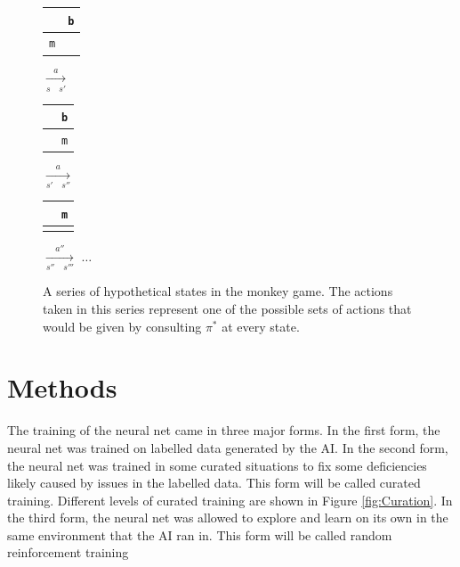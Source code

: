 \documentclass[%
 reprint,
nofootinbib,
 amsmath,amssymb,
 aps,
]{revtex4-1}
\begin{document}
\begin{figure}
  \begin{tabular}{|c|c|}
    \hline
    &\texttt{b}\\ \hline
    \texttt{m}&\\\hline
  \end{tabular}
  $\xrightarrow[s \quad s']{a}$
  \begin{tabular}{|c|c|}
    \hline
    &\texttt{b}\\ \hline
    \texttt{\hphantom{m}}&\texttt{m}\\\hline
  \end{tabular}
  $\xrightarrow[s' \quad s'']{a}$
  \begin{tabular}{|c|c|}
    \hline
    &\texttt{m}\\ \hline
    \texttt{\hphantom{m}}&\\\hline
  \end{tabular}
  $\xrightarrow[s'' \quad s''']{a''}$
  $\hdots$
  \caption{A series of hypothetical states in the monkey game. The actions taken in this series represent one of the possible sets of actions that would be given by consulting $\pi^*$ at every state.} \label{fig:States}
\end{figure}


\section{\label{sec:Methods}Methods}

The training of the neural net came in three major forms. In the first form, the neural net was trained on labelled data generated by the AI. In the second form, the neural net was trained in some curated situations to fix some deficiencies likely caused by issues in the labelled data. This form will be called curated training. Different levels of curated training are shown in Figure \ref{fig:Curation}. In the third form, the neural net was allowed to explore and learn on its own in the same environment that the AI ran in. This form will be called random reinforcement training
\end{document}
